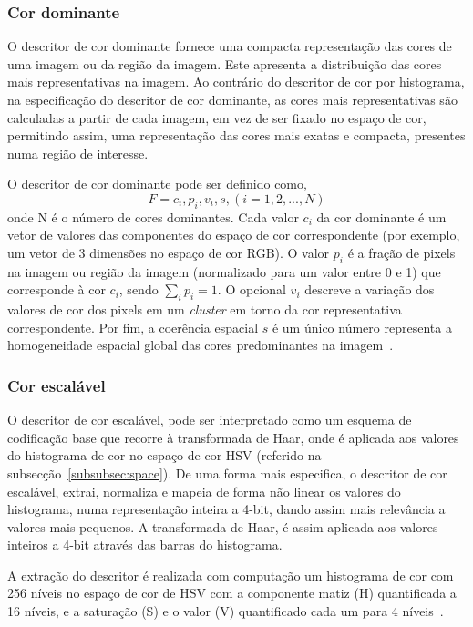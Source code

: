 \subsubsection{Cor dominante}

O descritor de cor dominante fornece uma compacta representação das cores de uma imagem ou da região da imagem. Este apresenta a distribuição das cores mais representativas na imagem. Ao contrário do descritor de cor por histograma, na especificação do descritor de cor dominante, as cores mais representativas são calculadas a partir de cada imagem, em vez de ser fixado no espaço de cor, permitindo assim, uma representação das cores mais exatas e compacta, presentes numa região de interesse.

O descritor de cor dominante pode ser definido como,
\[ F = {{c_{i}, p_{i}, v_{i}},s}, (i=1,2,...,N) \]
onde N é o número de cores dominantes. Cada valor $ c_{i} $ da cor dominante é um vetor de valores das componentes do espaço de cor correspondente (por exemplo, um vetor de 3 dimensões no espaço de cor RGB). O valor $ p_{i} $ é a fração de pixels na imagem ou região da imagem (normalizado para um valor entre 0 e 1) que corresponde à cor $ c_{i} $, sendo $  \sum_i p_{i} = 1 $. O opcional $ v_{i} $ descreve a variação dos valores de cor dos pixels em um \textit{cluster} em torno da cor representativa correspondente. Por fim, a coerência espacial $ s $ é um único número  representa a homogeneidade espacial global das cores predominantes na imagem~\cite{Ite-vil}.

\subsubsection{Cor escalável}

O descritor de cor escalável, pode ser interpretado como um esquema de codificação base que recorre à transformada de Haar, onde é aplicada aos valores do histograma de cor no espaço de cor HSV (referido na subsecção~\ref{subsubsec:space}). De uma forma mais especifica, o descritor de cor escalável, extrai, normaliza e mapeia de forma não linear os valores do histograma, numa representação inteira a 4-bit, dando assim mais relevância a valores mais pequenos. A transformada de Haar, é assim aplicada aos valores inteiros a 4-bit através das barras do histograma. 

A extração do descritor é realizada com computação um histograma de cor com 256 níveis no espaço de cor de HSV com a componente matiz (H) quantificada a 16 níveis, e a saturação (S) e o valor (V) quantificado cada um para 4 níveis~\cite{Christopoulos2000}. 

